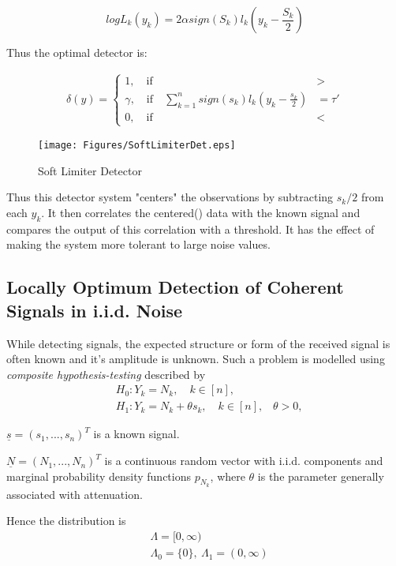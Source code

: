\documentclass[12pt]{report}
\begin{document}
\begin{exmp}
		\begin{equation}
		log L_k(y_k) = 2 \alpha sign(S_k) l_k(y_k - \frac{S_k}{2})
		\end{equation}
		
		
		Thus the optimal detector is:
		
		\begin{align*}
		\delta(y)=
		\begin{cases}
		1, \quad \text{if} &> \\
		\gamma, \quad \text{if} \quad\sum_{k=1}^{n} sign(s_k) l_k(y_k- \frac{s_k}{2}) &= \tau ' \\
		0, \quad \text{if} &< 
		\end{cases}
		\end{align*}
	
		\begin{figure}[h]
			\centering
			\texttt{[image: Figures/SoftLimiterDet.eps]}
			\caption{Soft Limiter Detector}
			\label{fig:SoftLimiterDet}
		\end{figure}
	\end{exmp}
	
	Thus this detector system "centers" the observations by subtracting $s_k/2$ from each $y_k$. It then correlates the centered() data with the known signal and compares the output of this correlation with a threshold. It has the effect of making the system more tolerant to large noise values.
	
	\subsection
	{Locally Optimum Detection of Coherent Signals in i.i.d. Noise}
	 
	While detecting signals, the expected structure or form  of the received signal is often known and it's amplitude is unknown. Such a problem is modelled using {\em composite hypothesis-testing} described by
	\begin{align*}	
	&H_{0}: Y_{k} = N_{k}, \quad  k \in [n],\\
	&H_{1}: Y_{k} = N_{k}+\theta{s_{k}}, \quad  k \in [n],\hspace{10pt}\theta>0,
	\end{align*}
	
	\begin{assum}
		$\underline{s}=(s_{1},...,s_{n})^T$ is a known signal.
	\end{assum}
	
	\begin{assum} $\underline{N}=(N_{1},...,N_{n})^T$ is a continuous random vector with i.i.d. components and marginal probability density functions $p_{N_{k}}$, where $\theta$ is the parameter generally associated with attenuation.
	\end{assum}
	\noindent Hence the distribution is
	\begin{align*}
	&\Lambda = [0, \infty)\\
	&\Lambda_0 = \{0\} , \ \Lambda_1 = (0, \infty)
	\end{align*}
	
\end{document}
